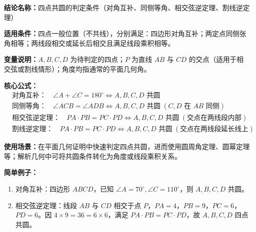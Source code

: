 \textbf{结论名称：}四点共圆的判定条件（对角互补、同侧等角、相交弦逆定理、割线逆定理）

\textbf{适用条件：}四点一般位置（不共线），分别满足：四边形对角互补；两定点同侧张角相等；两线段相交或延长后相交且满足线段乘积相等。

\textbf{变量说明：}$A,B,C,D$ 为待判定的四点；$P$ 为直线 $AB$ 与 $CD$ 的交点（适用于相交弦或割线情形）；角度均指通常的平面几何角。

\textbf{核心公式：}
\[
\begin{aligned}
&\text{对角互补：}\quad \boxed{\angle A+\angle C=180^\circ \iff A,B,C,D\text{ 共圆}}\\
&\text{同侧等角：}\quad \boxed{\angle ACB=\angle ADB \iff A,B,C,D\text{ 共圆}\;(C,D\text{ 在 }AB\text{ 同侧})}\\
&\text{相交弦逆定理：}\quad \boxed{PA\cdot PB=PC\cdot PD \iff A,B,C,D\text{ 共圆}}\;(\text{交点在两线段内部})\\
&\text{割线逆定理：}\quad \boxed{PA\cdot PB=PC\cdot PD \iff A,B,C,D\text{ 共圆}}\;(\text{交点在两线段延长线上})
\end{aligned}
\]

\textbf{使用场景：}在平面几何证明中快速判定四点共圆，进而使用圆周角定理、圆幂定理等；解析几何中可将共圆条件转化为角度或线段乘积关系。

\textbf{简单例子：}
\begin{enumerate}
  \item 对角互补：四边形 $ABCD$，已知 $\angle A=70^\circ,\angle C=110^\circ$，则 $A,B,C,D$ 共圆。
  \item 相交弦逆定理：线段 $AB$ 与 $CD$ 相交于点 $P$，$PA=4$，$PB=9$，$PC=6$，$PD=6$。因 $4\times 9=36=6\times 6$，满足 $PA\cdot PB=PC\cdot PD$，故 $A,B,C,D$ 四点共圆。
\end{enumerate}